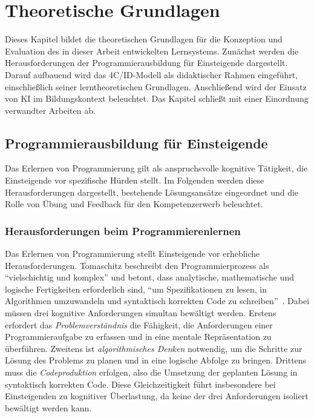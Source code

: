 \chapter{\textbf{Theoretische Grundlagen}}\label{ch:grundlagen}

Dieses Kapitel bildet die theoretischen Grundlagen für die Konzeption und Evaluation des in dieser Arbeit entwickelten Lernsystems. Zunächst werden die Herausforderungen der Programmierausbildung für Einsteigende dargestellt. Darauf aufbauend wird das 4C/ID-Modell als didaktischer Rahmen eingeführt, einschließlich seiner lerntheoretischen Grundlagen. Anschließend wird der Einsatz von KI im Bildungskontext beleuchtet. Das Kapitel schließt mit einer Einordnung verwandter Arbeiten ab.


\section{Programmierausbildung für Einsteigende}\label{sec:programmierausbildung}

Das Erlernen von Programmierung gilt als anspruchsvolle kognitive Tätigkeit, die Einsteigende vor spezifische Hürden stellt. Im Folgenden werden diese Herausforderungen dargestellt, bestehende Lösungsansätze eingeordnet und die Rolle von Übung und Feedback für den Kompetenzerwerb beleuchtet.

\subsection{Herausforderungen beim Programmierenlernen}\label{subsec:herausforderungen}

Das Erlernen von Programmierung stellt Einsteigende vor erhebliche Herausforderungen. Tomaschitz beschreibt den Programmierprozess als \enquote{vielschichtig und komplex} und betont, dass analytische, mathematische und logische Fertigkeiten erforderlich sind, \enquote{um Spezifikationen zu lesen, in Algorithmen umzuwandeln und syntaktisch korrekten Code zu schreiben}~\cite{tomaschitz2020}. Dabei müssen drei kognitive Anforderungen simultan bewältigt werden.
Erstens erfordert das \textit{Problemverständnis} die Fähigkeit, die Anforderungen einer Programmieraufgabe zu erfassen und in eine mentale Repräsentation zu überführen. Zweitens ist \textit{algorithmisches Denken} notwendig, um die Schritte zur Lösung des Problems zu planen und in eine logische Abfolge zu bringen. Drittens muss die \textit{Codeproduktion} erfolgen, also die Umsetzung der geplanten Lösung in syntaktisch korrekten Code. Diese Gleichzeitigkeit führt insbesondere bei Einsteigenden zu kognitiver Überlastung, da keine der drei Anforderungen isoliert bewältigt werden kann.

